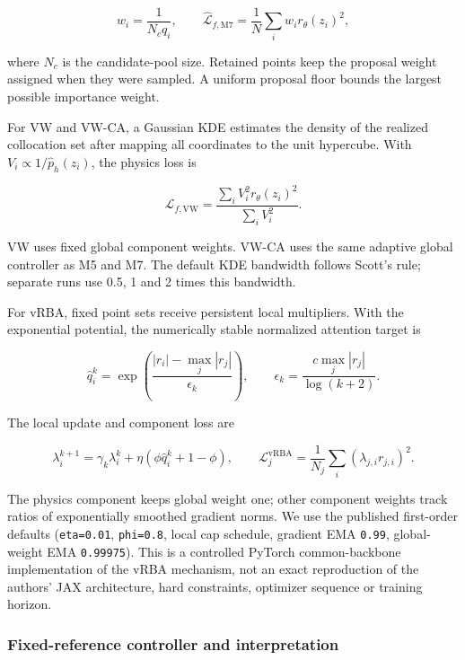 \documentclass[
  11pt,
]{article}
\begin{document}
\begin{equation}
w_i=\frac{1}{N_c q_i},
\qquad
\widehat{\mathcal L}_{f,\mathrm{M7}}
=\frac1N\sum_iw_i r_\theta(z_i)^2,
\end{equation}

where \(N_c\) is the candidate-pool size. Retained points keep the
proposal weight assigned when they were sampled. A uniform proposal
floor bounds the largest possible importance weight.

For VW and VW-CA, a Gaussian KDE estimates the density of the realized
collocation set after mapping all coordinates to the unit hypercube.
With \(V_i\propto1/\widehat p_h(z_i)\), the physics loss is

\begin{equation}
\mathcal L_{f,\mathrm{VW}}
=\frac{\sum_iV_i^2r_\theta(z_i)^2}{\sum_iV_i^2}.
\end{equation}

VW uses fixed global component weights. VW-CA uses the same adaptive
global controller as M5 and M7. The default KDE bandwidth follows
Scott's rule; separate runs use 0.5, 1 and 2 times this bandwidth.

For vRBA, fixed point sets receive persistent local multipliers. With
the exponential potential, the numerically stable normalized attention
target is

\begin{equation}
\widehat q_i^k=
\exp\!\left(\frac{|r_i|-\max_j|r_j|}{\epsilon_k}\right),
\qquad
\epsilon_k=\frac{c\max_j|r_j|}{\log(k+2)}.
\end{equation}

The local update and component loss are

\begin{equation}
\lambda_i^{k+1}=\gamma_k\lambda_i^k+
\eta\left(\phi\widehat q_i^k+1-\phi\right),
\qquad
\mathcal L_j^{\mathrm{vRBA}}=
\frac1{N_j}\sum_i(\lambda_{j,i}r_{j,i})^2.
\end{equation}

The physics component keeps global weight one; other component weights
track ratios of exponentially smoothed gradient norms. We use the
published first-order defaults (\texttt{eta=0.01}, \texttt{phi=0.8},
local cap schedule, gradient EMA \texttt{0.99}, global-weight EMA
\texttt{0.99975}). This is a controlled PyTorch common-backbone
implementation of the vRBA mechanism, not an exact reproduction of the
authors' JAX architecture, hard constraints, optimizer sequence or
training horizon.

\hypertarget{fixed-reference-controller-and-interpretation}{%
\subsubsection{Fixed-reference controller and
interpretation}\label{fixed-reference-controller-and-interpretation}}
\end{document}

